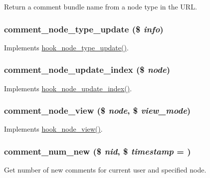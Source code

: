 Return a comment bundle name from a node type in the URL. \hypertarget{comment_8module_a8019cc0abaad27a1b5e5086f60a3c9ab}{
\subsubsection[{comment\_\-node\_\-type\_\-update}]{\setlength{\rightskip}{0pt plus 5cm}comment\_\-node\_\-type\_\-update (\$ {\em info})}}
\label{comment_8module_a8019cc0abaad27a1b5e5086f60a3c9ab}
Implements \hyperlink{group__hooks_ga7518f336bfbd131259f520fcd45ba710}{hook\_\-node\_\-type\_\-update()}. \hypertarget{comment_8module_a8810ffc5ce0ed7c78b997fe4e712913d}{
\subsubsection[{comment\_\-node\_\-update\_\-index}]{\setlength{\rightskip}{0pt plus 5cm}comment\_\-node\_\-update\_\-index (\$ {\em node})}}
\label{comment_8module_a8810ffc5ce0ed7c78b997fe4e712913d}
Implements \hyperlink{group__node__api__hooks_gac8420f204c69a4dc641f4d809a870b05}{hook\_\-node\_\-update\_\-index()}. \hypertarget{comment_8module_af67cef07b57f84e54b8b26c38fe0fda0}{
\subsubsection[{comment\_\-node\_\-view}]{\setlength{\rightskip}{0pt plus 5cm}comment\_\-node\_\-view (\$ {\em node}, \/  \$ {\em view\_\-mode})}}
\label{comment_8module_af67cef07b57f84e54b8b26c38fe0fda0}
Implements \hyperlink{group__node__api__hooks_ga475290ee8e81a2373ea17c512cc3f9a9}{hook\_\-node\_\-view()}. \hypertarget{comment_8module_aea0352c132a14dde4c550fd2321ee67d}{
\subsubsection[{comment\_\-num\_\-new}]{\setlength{\rightskip}{0pt plus 5cm}comment\_\-num\_\-new (\$ {\em nid}, \/  \$ {\em timestamp} = {})}}
\label{comment_8module_aea0352c132a14dde4c550fd2321ee67d}
Get number of new comments for current user and specified node.


